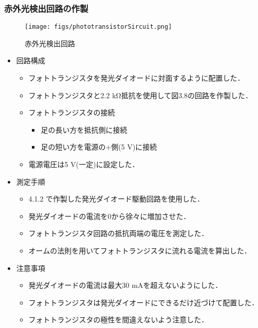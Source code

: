 \documentclass{ltjsarticle}
\begin{document}
\subsubsection{赤外光検出回路の作製}
\begin{figure}[H]
  \centering
  \texttt{[image: figs/phototransistorSircuit.png]}
  \caption{赤外光検出回路}
\end{figure}
\begin{itemize}
  \item 回路構成
  \begin{itemize}
    \item フォトトランジスタを発光ダイオードに対面するように配置した．
    \item フォトトランジスタと2.2 kΩ抵抗を使用して図3.8の回路を作製した．
    \item フォトトランジスタの接続
      \begin{itemize}
        \item 足の長い方を抵抗側に接続
        \item 足の短い方を電源の+側(5 V)に接続
      \end{itemize}
    \item 電源電圧は5 V(一定)に設定した．
  \end{itemize}
  \item 測定手順
  \begin{itemize}
    \item 4.1.2 で作製した発光ダイオード駆動回路を使用した．
    \item 発光ダイオードの電流を0から徐々に増加させた．
    \item フォトトランジスタ回路の抵抗両端の電圧を測定した．
    \item オームの法則を用いてフォトトランジスタに流れる電流を算出した．
  \end{itemize}
  \item 注意事項
  \begin{itemize}
    \item 発光ダイオードの電流は最大30 mAを超えないようにした．
    \item フォトトランジスタは発光ダイオードにできるだけ近づけて配置した．
    \item フォトトランジスタの極性を間違えないよう注意した．
  \end{itemize}
\end{itemize}
\end{document}
